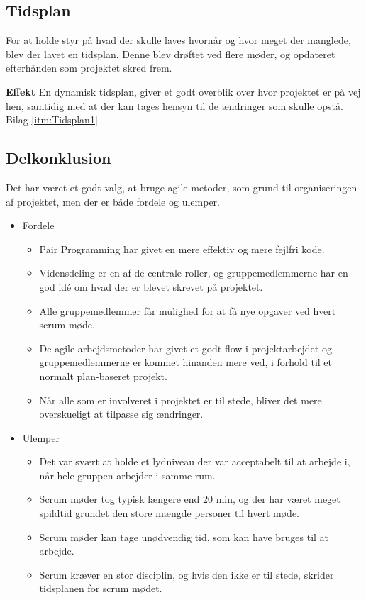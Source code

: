 
\subsection{Tidsplan}
For at holde styr på hvad der skulle laves hvornår og hvor meget der manglede, blev der lavet en tidsplan. Denne blev drøftet ved flere møder, og opdateret efterhånden som projektet skred frem.

\textbf{Effekt}
En dynamisk tidsplan, giver et godt overblik over hvor projektet er på vej hen, samtidig med at der kan tages hensyn til de ændringer som skulle opstå.  Bilag \ref{itm:Tidsplan1}

\subsection{Delkonklusion}
Det har været et godt valg, at bruge agile metoder, som grund til organiseringen af projektet, men der er både fordele og ulemper.\\

\begin{itemize}
	\item Fordele
\begin{itemize}
	\item Pair Programming har givet en mere effektiv og mere fejlfri kode.
	\item Vidensdeling er en af de centrale roller, og gruppemedlemmerne har en god idé om hvad der er blevet skrevet på 					  projektet.
	\item Alle gruppemedlemmer får mulighed for at få nye opgaver ved hvert scrum møde.
	\item De agile arbejdsmetoder har givet et godt flow i projektarbejdet og gruppemedlemmerne er kommet 					  hinanden mere ved, i forhold til et normalt plan-baseret projekt.
	\item Når alle som er involveret i projektet er til stede, bliver det mere overskueligt at tilpasse sig ændringer.
\end{itemize}

	\item Ulemper
\begin{itemize}
	\item Det var svært at holde et lydniveau der var acceptabelt til at arbejde i, når hele gruppen arbejder i samme rum.
	\item Scrum møder tog typisk længere end 20 min, og der har været meget spildtid grundet den store mængde personer til hvert møde.
	\item Scrum møder kan tage unødvendig tid, som kan have bruges til at arbejde.
	\item Scrum kræver en stor disciplin, og hvis den ikke er til stede, skrider tidsplanen for scrum mødet.
\end{itemize}
\end{itemize}

